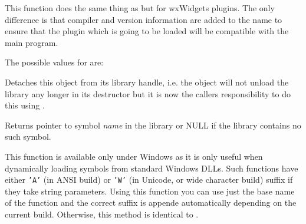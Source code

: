 



\label{wxdynamiclibrarycanonicalizepluginname}


This function does the same thing as 
 but for wxWidgets
plugins. The only difference is that compiler and version information are added
to the name to ensure that the plugin which is going to be loaded will be
compatible with the main program.

The possible values for  are:

\begin{twocollist}
\end{twocollist}


\label{wxdynamiclibrarydetach}


Detaches this object from its library handle, i.e. the object will not unload
the library any longer in its destructor but it is now the callers
responsibility to do this using .


\label{wxdynamiclibrarygetsymbol}


Returns pointer to symbol {\it name} in the library or NULL if the library
contains no such symbol.




\label{wxdynamiclibrarygetsymbolaorw}


This function is available only under Windows as it is only useful when
dynamically loading symbols from standard Windows DLLs. Such functions have
either \texttt{'A'} (in ANSI build) or \texttt{'W'} (in Unicode, or wide
character build) suffix if they take string parameters. Using this function you
can use just the base name of the function and the correct suffix is appende
automatically depending on the current build. Otherwise, this method is
identical to .


